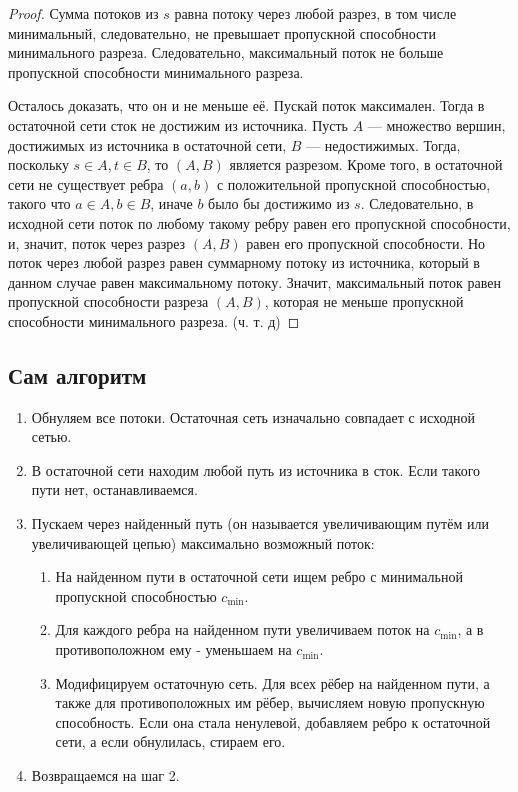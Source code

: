 \begin{proof}
	Сумма потоков из $s$ равна потоку через любой разрез, в том числе минимальный, следовательно, не превышает пропускной способности минимального разреза. Следовательно, максимальный поток не больше пропускной способности минимального разреза.
	
	Осталось доказать, что он и не меньше её. Пускай поток максимален. 
	Тогда в остаточной сети сток не достижим из источника. 
	Пусть $A$ --- множество вершин, достижимых из источника в остаточной сети, $B$ --- недостижимых. Тогда, поскольку $s \in A, t \in B$, то $(A,B)$ является разрезом. 
	Кроме того, в остаточной сети не существует ребра $(a, b)$ с положительной пропускной способностью, такого что $a \in A, b \in B$, иначе $b$ было бы достижимо из $s$. 
	Следовательно, в исходной сети поток по любому такому ребру равен его пропускной способности, и, значит, поток через разрез $(A,B)$ равен его пропускной способности. 
	Но поток через любой разрез равен суммарному потоку из источника, который в данном случае равен максимальному потоку. 
	Значит, максимальный поток равен пропускной способности разреза $(A,B)$, которая не меньше пропускной способности минимального разреза. 
	(ч. т. д)
\end{proof}

\subsection*{Сам алгоритм}
\begin{enumerate}
	\item Обнуляем все потоки. Остаточная сеть изначально совпадает с исходной сетью.
	\item В остаточной сети находим любой путь из источника в сток. Если такого пути нет, останавливаемся.
	\item Пускаем через найденный путь (он называется увеличивающим путём или увеличивающей цепью) максимально возможный поток:
	\begin{enumerate}
		\item На найденном пути в остаточной сети ищем ребро с минимальной пропускной способностью $c_{\min}$.
		\item Для каждого ребра на найденном пути увеличиваем поток на $c_{\min}$, а в противоположном ему - уменьшаем на $c_{\min}$.
		\item Модифицируем остаточную сеть. Для всех рёбер на найденном пути, а также для противоположных им рёбер, вычисляем новую пропускную способность. Если она стала ненулевой, добавляем ребро к остаточной сети, а если обнулилась, стираем его.
	\end{enumerate}
	\item Возвращаемся на шаг 2.
\end{enumerate}

